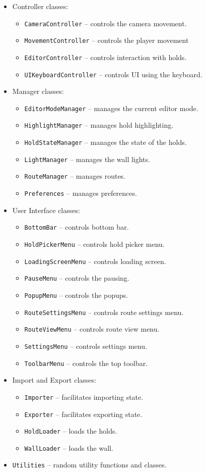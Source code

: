\begin{itemize}
	\item Controller classes:
	\begin{itemize}
		\item \verb|CameraController| -- controls the camera movement.
		\item \verb|MovementController| -- controls the player movement
		\item \verb|EditorController| -- controls interaction with holds.
		\item \verb|UIKeyboardController| -- controls UI using the keyboard.
	\end{itemize}
	\item Manager classes:
	\begin{itemize}
		\item \verb|EditorModeManager| -- manages the current editor mode.
		\item \verb|HighlightManager| -- manages hold highlighting.
		\item \verb|HoldStateManager| -- manages the state of the holds.
		\item \verb|LightManager| -- manages the wall lights.
		\item \verb|RouteManager| -- manages routes.
		\item \verb|Preferences| -- manages preferences.
	\end{itemize}
	\item User Interface classes:
	\begin{itemize}
		\item \verb|BottomBar| -- controls bottom bar.
		\item \verb|HoldPickerMenu| -- controls hold picker menu.
		\item \verb|LoadingScreenMenu| -- controls loading screen.
		\item \verb|PauseMenu| -- controls the pausing.
		\item \verb|PopupMenu| -- controls the popups.
		\item \verb|RouteSettingsMenu| -- controls route settings menu.
		\item \verb|RouteViewMenu| -- controls route view menu.
		\item \verb|SettingsMenu| -- controls settings menu.
		\item \verb|ToolbarMenu| -- controls the top toolbar.
	\end{itemize}
	\item Import and Export classes:
	\begin{itemize}
		\item \verb|Importer| -- facilitates importing state.
		\item \verb|Exporter| -- facilitates exporting state.
		\item \verb|HoldLoader| -- loads the holds.
		\item \verb|WallLoader| -- loads the wall.
	\end{itemize}
	\item \verb|Utilities| -- random utility functions and classes.
\end{itemize}

